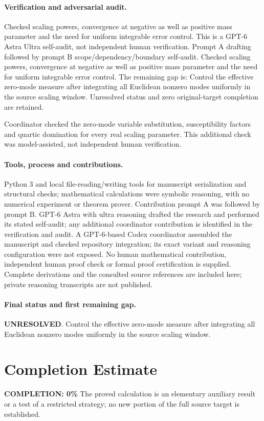 \documentclass[11pt]{article}
\begin{document}
\paragraph{Verification and adversarial audit.}
Checked scaling powers, convergence at negative as well as positive mass parameter and the need for uniform integrable error control. This is a GPT-6 Astra Ultra self-audit, not independent human verification. Prompt A drafting followed by prompt B scope/dependency/boundary self-audit. Checked scaling powers, convergence at negative as well as positive mass parameter and the need for uniform integrable error control. The remaining gap is: Control the effective zero-mode measure after integrating all Euclidean nonzero modes uniformly in the source scaling window. Unresolved status and zero original-target completion are retained.

Coordinator checked the zero-mode variable substitution, susceptibility factors and quartic domination for every real scaling parameter. This additional check was model-assisted, not independent human verification.

\paragraph{Tools, process and contributions.}
Python 3 and local file-reading/writing tools for manuscript serialization and structural checks; mathematical calculations were symbolic reasoning, with no numerical experiment or theorem prover. Contribution prompt A was followed by prompt B. GPT-6 Astra with ultra reasoning drafted the research and performed its stated self-audit; any additional coordinator contribution is identified in the verification and audit. A GPT-6-based Codex coordinator assembled the manuscript and checked repository integration; its exact variant and reasoning configuration were not exposed. No human mathematical contribution, independent human proof check or formal proof certification is supplied. Complete derivations and the consulted source references are included here; private reasoning transcripts are not published.

\paragraph{Final status and first remaining gap.}
\textbf{UNRESOLVED}. Control the effective zero-mode measure after integrating all Euclidean nonzero modes uniformly in the source scaling window.

\section{Completion Estimate}
\noindent\textbf{COMPLETION: 0\%}
The proved calculation is an elementary auxiliary result or a test of a restricted strategy; no new portion of the full source target is established.
\end{document}
